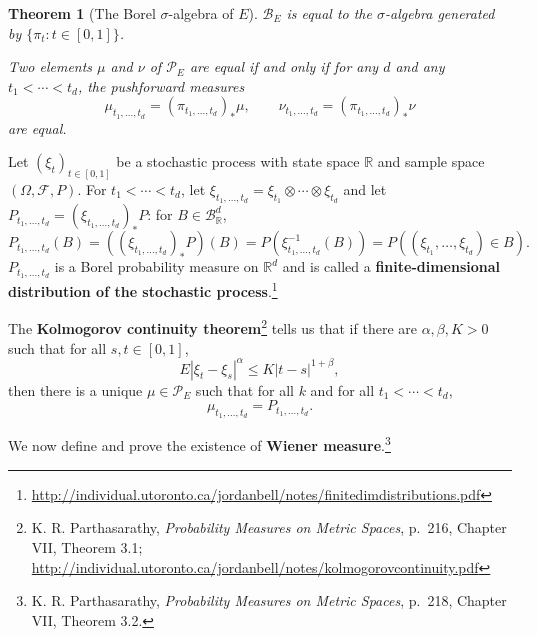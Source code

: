 \documentclass{article}
\newtheorem{theorem}{Theorem}
\theoremstyle{definition}
\begin{document}
\begin{theorem}[The Borel $\sigma$-algebra of $E$]
$\mathscr{B}_E$ is equal to the $\sigma$-algebra generated by $\{\pi_t: t \in [0,1]\}$.

Two elements $\mu$ and $\nu$ of $\mathscr{P}_E$ are equal if and only if for any $d$ and any $t_1<\cdots<t_d$, the pushforward measures
\[
\mu_{t_1,\ldots,t_d} = (\pi_{t_1,\ldots,t_d})_* \mu,\qquad
\nu_{t_1,\ldots,t_d} =  (\pi_{t_1,\ldots,t_d})_* \nu
\]
are equal.
\label{theorem21}
\end{theorem}



Let $(\xi_t)_{t \in [0,1]}$ be a stochastic process with state space $\mathbb{R}$ and sample space
$(\Omega,\mathscr{F},P)$. 
For $t_1<\cdots<t_d$,
let $\xi_{t_1,\ldots,t_d} = \xi_{t_1} \otimes \cdots \otimes \xi_{t_d}$ and
let $P_{t_1,\ldots,t_d} = (\xi_{t_1,\ldots,t_d})_*P$: for $B \in \mathscr{B}_{\mathbb{R}}^d$,  
\[
P_{t_1,\ldots,t_d}(B) = ((\xi_{t_1,\ldots,t_d})_*P)(B) = P(\xi_{t_1,\ldots,t_d}^{-1}(B))
=P((\xi_{t_1},\ldots,\xi_{t_d}) \in B).
\]
$P_{t_1,\ldots,t_d}$ is a Borel probability measure on $\mathbb{R}^d$ and is called a \textbf{finite-dimensional distribution
of the stochastic process}.\footnote{\url{http://individual.utoronto.ca/jordanbell/notes/finitedimdistributions.pdf}}

The \textbf{Kolmogorov continuity theorem}\footnote{K. R.
Parthasarathy, {\em Probability Measures on Metric Spaces}, p.~216, Chapter VII, Theorem 3.1;
\url{http://individual.utoronto.ca/jordanbell/notes/kolmogorovcontinuity.pdf}}
tells us that if there are $\alpha,\beta,K>0$ 
such that  for all $s,t \in [0,1]$,
\[
E |\xi_t - \xi_s|^\alpha \leq K |t-s|^{1+\beta},
\]
then there is a unique $\mu \in \mathscr{P}_E$ such that for all $k$ and for all $t_1<\cdots<t_d$,
\[
\mu_{t_1,\ldots,t_d} = P_{t_1,\ldots,t_d}.
\]

We now define and prove the existence of \textbf{Wiener measure}.\footnote{K. R.
Parthasarathy, {\em Probability Measures on Metric Spaces}, p.~218, Chapter VII, Theorem 3.2.}
\end{document}
